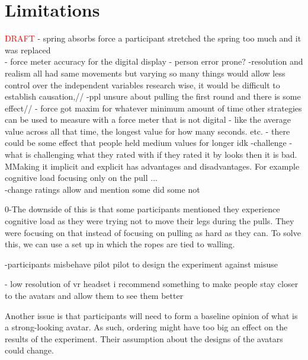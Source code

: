 \section{Limitations}
\label{section:limitations}
\textcolor{red}{DRAFT   }
- spring absorbs force a participant stretched the spring too much and it was replaced\\
- force meter accuracy for the digital display
- person error prone?
-resolution and realism all had same movements but varying so many things would allow less control over the independent variables research wise, it would be difficult to establish causation,//
-ppl unsure about pulling the first round and there is some effect//
- force got maxim for whatever minimum amount of time other strategies can be used to measure with a force meter that is not digital - like the average value across all that time, the longest value for how many seconds. etc.
- there could be some effect that people held medium values for longer idk
-challenge - what is challenging what they rated with if they rated it by looks then it is bad. MMaking it implicit and explicit has advantages and disadvantages. For example cognitive load focusing only on the pull ...\\
-change ratings allow and mention some did some not

0-The downside of this is that some participants mentioned they experience cognitive load as they were trying not to move their legs during the pulls. They were focusing on that instead of focusing on pulling as hard as they can. To solve this, we can use a set up in which the ropes are tied to walling.

-participants misbehave pilot pilot to design the experiment against misuse

- low resolution of vr headset i recommend something to make people stay closer to the avatars  and allow them to see them better


Another issue is that participants will need to form a baseline opinion of what is a strong-looking avatar. As such, ordering might have too big an effect on the results of the experiment. Their assumption about the designs of the avatars could change. 